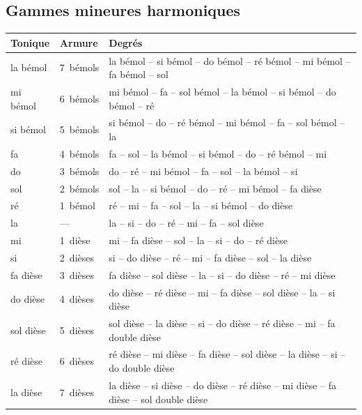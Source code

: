 \subsection{Gammes mineures harmoniques}
\begin{longtable}{@{}l l >{\raggedright\arraybackslash}p{12.6cm}@{}}
\toprule
\textbf{Tonique} & \textbf{Armure} & \textbf{Degrés} \\
\midrule
\endhead
la bémol & 7~bémols & la bémol -- si bémol -- do bémol -- ré bémol -- mi bémol -- fa bémol -- sol \\
mi bémol & 6~bémols & mi bémol -- fa -- sol bémol -- la bémol -- si bémol -- do bémol -- ré \\
si bémol & 5~bémols & si bémol -- do -- ré bémol -- mi bémol -- fa -- sol bémol -- la \\
fa & 4~bémols & fa -- sol -- la bémol -- si bémol -- do -- ré bémol -- mi \\
do & 3~bémols & do -- ré -- mi bémol -- fa -- sol -- la bémol -- si \\
sol & 2~bémols & sol -- la -- si bémol -- do -- ré -- mi bémol -- fa dièse \\
ré & 1~bémol & ré -- mi -- fa -- sol -- la -- si bémol -- do dièse \\
la & --- & la -- si -- do -- ré -- mi -- fa -- sol dièse \\
mi & 1~dièse & mi -- fa dièse -- sol -- la -- si -- do -- ré dièse \\
si & 2~dièses & si -- do dièse -- ré -- mi -- fa dièse -- sol -- la dièse \\
fa dièse & 3~dièses & fa dièse -- sol dièse -- la -- si -- do dièse -- ré -- mi dièse \\
do dièse & 4~dièses & do dièse -- ré dièse -- mi -- fa dièse -- sol dièse -- la -- si dièse \\
sol dièse & 5~dièses & sol dièse -- la dièse -- si -- do dièse -- ré dièse -- mi -- fa double dièse \\
ré dièse & 6~dièses & ré dièse -- mi dièse -- fa dièse -- sol dièse -- la dièse -- si -- do double dièse \\
la dièse & 7~dièses & la dièse -- si dièse -- do dièse -- ré dièse -- mi dièse -- fa dièse -- sol double dièse \\
\bottomrule
\end{longtable}

